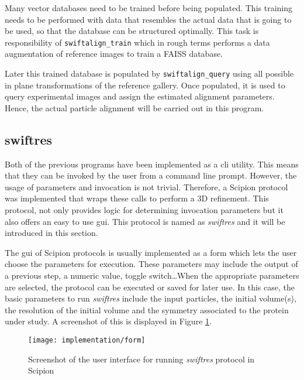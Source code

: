 \documentclass[../main.tex]{subfiles}
\begin{document}
Many vector databases need to be trained before being populated. This training needs to be performed with data that resembles the actual data that is going to be used, so that the database can be structured optimally. This task is responsibility of \texttt{swiftalign\_train} which in rough terms performs a data augmentation of reference images to train a FAISS database.

Later this trained database is populated by \texttt{swiftalign\_query} using all possible in plane transformations of the reference gallery. Once populated, it is used to query experimental images and assign the estimated alignment parameters. Hence, the actual particle alignment will be carried out in this program.

\subsection{swiftres}
Both of the previous programs have been implemented as a \gls{cli} utility. This means that they can be invoked by the user from a command line prompt. However, the usage of parameters and invocation is not trivial. Therefore, a Scipion protocol was implemented that wraps these calls to perform a 3D refinement. This protocol, not only provides logic for determining invocation parameters but it also offers an easy to use \gls{gui}. This protocol is named as \textit{swiftres} and it will be introduced in this section.

The \gls{gui} of Scipion protocols is usually implemented as a form which lets the user choose the parameters for execution. These parameters may include the output of a previous step, a numeric value, toggle switch\dots When the appropriate parameters are selected, the protocol can be executed or saved for later use. In this case, the basic parameters to run \textit{swiftres} include the input particles, the initial volume(s), the resolution of the initial volume and the symmetry associated to the protein under study. A screenshot of this is displayed in Figure \ref{fig:4:form}.

\begin{figure}[hbpt]
    \centering
    \texttt{[image: implementation/form]}
    \caption{Screenshot of the user interface for running \textit{swiftres} protocol in Scipion}
    \label{fig:4:form}
\end{figure}
\end{document}
